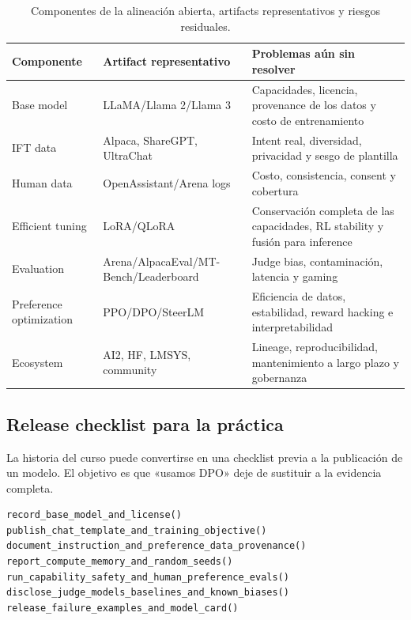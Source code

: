 \documentclass[a4paper]{article}
\begin{document}
\begin{table}[H]
\centering
\small
\begin{tabularx}{\textwidth}{L{0.16\textwidth} L{0.22\textwidth} X}
\toprule
Componente & Artifact representativo & Problemas aún sin resolver \\
\midrule
Base model & LLaMA/Llama 2/Llama 3 & Capacidades, licencia, provenance de los datos y costo de entrenamiento \\
IFT data & Alpaca, ShareGPT, UltraChat & Intent real, diversidad, privacidad y sesgo de plantilla \\
Human data & OpenAssistant/Arena logs & Costo, consistencia, consent y cobertura \\
Efficient tuning & LoRA/QLoRA & Conservación completa de las capacidades, RL stability y fusión para inference \\
Evaluation & Arena/AlpacaEval/MT-Bench/Leaderboard & Judge bias, contaminación, latencia y gaming \\
Preference optimization & PPO/DPO/SteerLM & Eficiencia de datos, estabilidad, reward hacking e interpretabilidad \\
Ecosystem & AI2, HF, LMSYS, community & Lineage, reproducibilidad, mantenimiento a largo plazo y gobernanza \\
\bottomrule
\end{tabularx}
\caption{Componentes de la alineación abierta, artifacts representativos y riesgos residuales.}
\end{table}

\subsection{Release checklist para la práctica}

La historia del curso puede convertirse en una checklist previa a la publicación de un modelo. El objetivo es que «usamos DPO» deje de sustituir a la evidencia completa.

\begin{lstlisting}[caption={Open aligned model release checklist}]
record_base_model_and_license()
publish_chat_template_and_training_objective()
document_instruction_and_preference_data_provenance()
report_compute_memory_and_random_seeds()
run_capability_safety_and_human_preference_evals()
disclose_judge_models_baselines_and_known_biases()
release_failure_examples_and_model_card()
\end{lstlisting}
\end{document}
